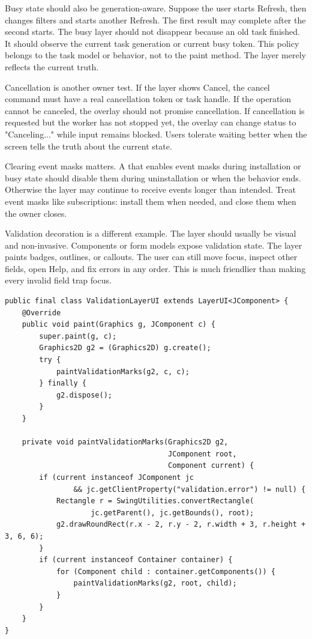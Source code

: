 Busy state should also be generation-aware. Suppose the user starts Refresh,
then changes filters and starts another Refresh. The first result may complete
after the second starts. The busy layer should not disappear because an old task
finished. It should observe the current task generation or current busy token.
This policy belongs to the task model or behavior, not to the paint method. The
layer merely reflects the current truth.

Cancellation is another owner test. If the layer shows Cancel, the cancel
command must have a real cancellation token or task handle. If the operation
cannot be canceled, the overlay should not promise cancellation. If cancellation
is requested but the worker has not stopped yet, the overlay can change status
to "Canceling..." while input remains blocked. Users tolerate waiting better
when the screen tells the truth about the current state.

Clearing event masks matters. A  that enables event masks during installation or busy state should disable them during uninstallation or when the behavior ends. Otherwise the layer may continue to receive events longer than intended. Treat event masks like subscriptions: install them when needed, and close them when the owner closes.

Validation decoration is a different  example. The layer should usually be visual and non-invasive. Components or form models expose validation state. The layer paints badges, outlines, or callouts. The user can still move focus, inspect other fields, open Help, and fix errors in any order. This is much friendlier than making every invalid field trap focus.

\begin{lstlisting}[caption={Painting validation marks for descendants with a client property.}]
public final class ValidationLayerUI extends LayerUI<JComponent> {
    @Override
    public void paint(Graphics g, JComponent c) {
        super.paint(g, c);
        Graphics2D g2 = (Graphics2D) g.create();
        try {
            paintValidationMarks(g2, c, c);
        } finally {
            g2.dispose();
        }
    }

    private void paintValidationMarks(Graphics2D g2,
                                      JComponent root,
                                      Component current) {
        if (current instanceof JComponent jc
                && jc.getClientProperty("validation.error") != null) {
            Rectangle r = SwingUtilities.convertRectangle(
                    jc.getParent(), jc.getBounds(), root);
            g2.drawRoundRect(r.x - 2, r.y - 2, r.width + 3, r.height + 3, 6, 6);
        }
        if (current instanceof Container container) {
            for (Component child : container.getComponents()) {
                paintValidationMarks(g2, root, child);
            }
        }
    }
}
\end{lstlisting}

